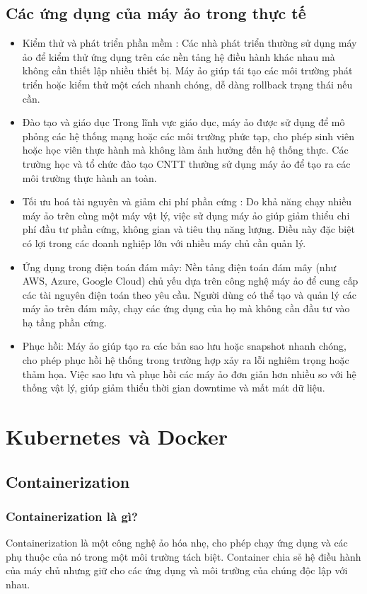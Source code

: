 \documentclass[a4paper,12pt]{article}
\begin{document}
\subsection{ Các ứng dụng của máy ảo trong thực tế}
\begin{itemize}
    \item Kiểm thử và phát triển phần mềm :
Các nhà phát triển thường sử dụng máy ảo để kiểm thử ứng dụng trên các nền tảng hệ điều hành khác nhau mà không cần thiết lập nhiều thiết bị. Máy ảo giúp tái tạo các môi trường phát triển hoặc kiểm thử một cách nhanh chóng, dễ dàng rollback trạng thái nếu cần.
    \item  Đào tạo và giáo dục
Trong lĩnh vực giáo dục, máy ảo được sử dụng để mô phỏng các hệ thống mạng hoặc các môi trường phức tạp, cho phép sinh viên hoặc học viên thực hành mà không làm ảnh hưởng đến hệ thống thực. Các trường học và tổ chức đào tạo CNTT thường sử dụng máy ảo để tạo ra các môi trường thực hành an toàn.
    \item Tối ưu hoá tài nguyên và giảm chi phí phần cứng :
Do khả năng chạy nhiều máy ảo trên cùng một máy vật lý, việc sử dụng máy ảo giúp giảm thiểu chi phí đầu tư phần cứng, không gian và tiêu thụ năng lượng. Điều này đặc biệt có lợi trong các doanh nghiệp lớn với nhiều máy chủ cần quản lý.
\item  Ứng dụng trong điện toán đám mây:
Nền tảng điện toán đám mây (như AWS, Azure, Google Cloud) chủ yếu dựa trên công nghệ máy ảo để cung cấp các tài nguyên điện toán theo yêu cầu. Người dùng có thể tạo và quản lý các máy ảo trên đám mây, chạy các ứng dụng của họ mà không cần đầu tư vào hạ tầng phần cứng.
\item Phục hồi: Máy ảo giúp tạo ra các bản sao lưu hoặc snapshot nhanh chóng, cho phép phục hồi hệ thống trong trường hợp xảy ra lỗi nghiêm trọng hoặc thảm họa. Việc sao lưu và phục hồi các máy ảo đơn giản hơn nhiều so với hệ thống vật lý, giúp giảm thiểu thời gian downtime và mất mát dữ liệu.

\end{itemize}

\section{ Kubernetes và Docker}
\subsection{ Containerization}
\subsubsection{Containerization là gì?}
Containerization là một công nghệ ảo hóa nhẹ, cho phép chạy ứng dụng và các phụ thuộc của nó trong một môi trường tách biệt. Container chia sẻ hệ điều hành của máy chủ nhưng giữ cho các ứng dụng và môi trường của chúng độc lập với nhau.
\end{document}
